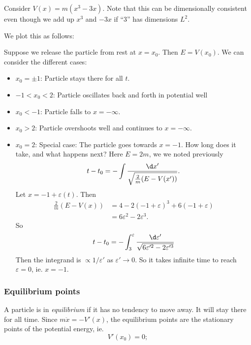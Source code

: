 \documentclass[a4paper]{article}
\begin{document}
\begin{eg}
  Consider $V(x) = m(x^3 - 3x)$. Note that this can be dimensionally consistent even though we add up $x^3$ and $-3x$ if ``3'' has dimensions $L^2$.

  We plot this as follows:
  \begin{center}
  \end{center}

  Suppose we release the particle from rest at $x = x_0$. Then $E = V(x_0)$. We can consider the different cases:
  \begin{itemize}
    \item $x_0 = \pm 1$: Particle stays there for all $t$.
    \item $-1 < x_0 < 2$: Particle oscillates back and forth in potential well
    \item $x_0 < -1$: Particle falls to $x = -\infty$.
    \item $x_0 > 2$: Particle overshoots well and continues to $x = -\infty$.
    \item $x_0 = 2$: Special case: The particle goes towards $x = -1$. How long does it take, and what happens next? Here $E = 2m$, we we noted previously
      \[
        t - t_0 = -\int \frac{\d x'}{\sqrt{\frac{2}{m}(E - V(x'))}}.
      \]
      Let $x = -1 + \varepsilon(t)$. Then
      \begin{align*}
        \frac{2}{m}(E-V(x)) &= 4 - 2(-1 + \varepsilon)^3 + 6(-1 + \varepsilon)\\
        &= 6\varepsilon^2 - 2\varepsilon^3.
      \end{align*}
      So
      \[
        t - t_0 = -\int_3^\varepsilon \frac{\d \varepsilon'}{\sqrt{6\varepsilon'^2 - 2\varepsilon'^3}}
      \]
      Then the integrand is $\propto 1/\varepsilon '$ as $\varepsilon' \to 0$. So it takes infinite time to reach $\varepsilon = 0$, ie. $x = -1$.
  \end{itemize}
\end{eg}
\subsubsection{Equilibrium points}
\begin{defi}
  A particle is in \emph{equilibrium} if it has no tendency to move away. It will stay there for all time. Since $m\ddot{x} = -V'(x)$, the equilibrium points are the stationary points of the potential energy, ie.
  \[
    V'(x_0) = 0;
  \]
\end{defi}
\end{document}
